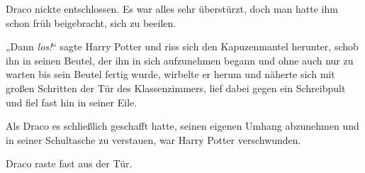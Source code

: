 Draco nickte entschlossen. Es war alles sehr überstürzt, doch man hatte ihm schon früh beigebracht, sich zu beeilen.

„Dann \emph{los!}“ sagte Harry Potter und riss sich den Kapuzenmantel herunter, schob ihn in seinen Beutel, der ihn in sich aufzunehmen begann und ohne auch nur zu warten bis sein Beutel fertig wurde, wirbelte er herum und näherte sich mit großen Schritten der Tür des Klassenzimmers, lief dabei gegen ein Schreibpult und fiel fast hin in seiner Eile.

Als Draco es schließlich geschafft hatte, seinen eigenen Umhang abzunehmen und in seiner Schultasche zu verstauen, war Harry Potter verschwunden.

Draco raste fast aus der Tür.

